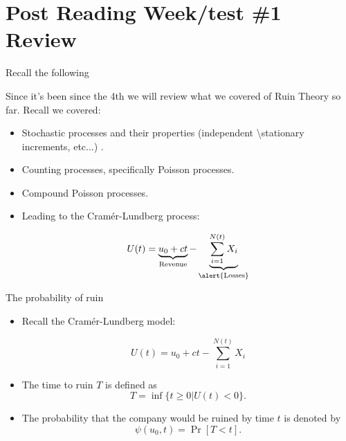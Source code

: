 \documentclass[11pt]{beamer}
\begin{document}
\section{Post Reading Week/test \#1 Review}
\begin{frame}{Recall the following}

Since it's been since the 4th we will review what we covered of Ruin Theory so far. Recall we covered: 

\begin{itemize}

\item Stochastic processes and their properties (independent \textbackslash stationary increments, etc...) .

\item Counting processes, specifically Poisson processes. 

\item Compound Poisson processes.

\item Leading to the \alert{Cram\'er-Lundberg process}:

$$U(t)=\underbrace{u_0+ct}_\text{Revenue} - \underbrace{\sum_{i=1}^{N(t)}X_i}_\text{\alert{Losses}}$$ 

\end{itemize}



\end{frame}
\begin{frame}{The probability of ruin}

\begin{itemize}

\item Recall the Cram\'er-Lundberg model:

$$U(t)= u_0+ct - \sum_{i=1}^{N(t)}X_i$$

\item The time to ruin $T$ is defined as
$$T=\inf \{ t\ge 0 | U(t)<0\}.$$

\item The probability that the company would be ruined by time $t$ is denoted by
$$\psi(u_0,t)=\Pr[T<t].$$

\end{itemize}

\end{frame}
\end{document}
